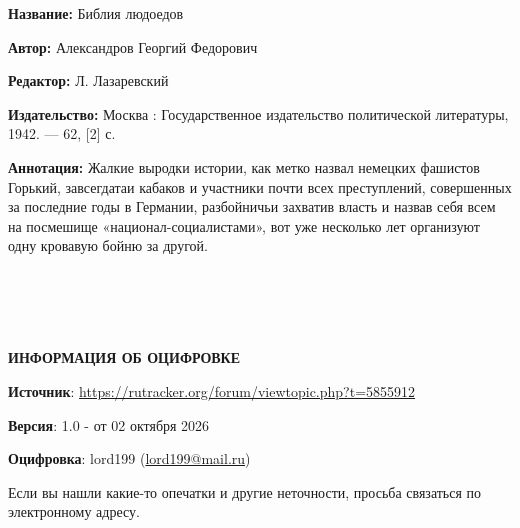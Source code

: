 \documentclass[12pt, a4paper, openany]{book}
\begin{document}
	{\bf Название:} Библия людоедов
	
{\bf Автор:} Александров Георгий Федорович

{\bf Редактор:} Л. Лазаревский
	
{\bf Издательство:} Москва : Государственное издательство политической литературы, 1942. — 62, [2] с.
	
		{\bf Аннотация:} Жалкие выродки истории, как метко назвал немецких фашистов Горький, завсегдатаи кабаков и участники почти всех преступлений, совершенных за последние годы в Германии, разбойничьи захватив власть и назвав себя всем на посмешище «национал-социалистами», вот уже несколько лет организуют одну кровавую бойню за другой.
		


		\thispagestyle{empty} %


\newpage

\setcounter{secnumdepth}{0}  


\ \\
\ \\
\ \\
\ \\

\hangindent=2cm   	\textbf{ИНФОРМАЦИЯ ОБ ОЦИФРОВКЕ}

\hangindent=2cm   	\textbf{Источник}:  \href{https://rutracker.org/forum/viewtopic.php?t=5855912}{https://rutracker.org/forum/viewtopic.php?t=5855912} 

\hangindent=2cm   	\textbf{Версия}: 1.0 - от 02 октября 2026

\hangindent=2cm   	\textbf{Оцифровка}: lord199 (\href{mailto:lord199@mail.ru}{lord199@mail.ru})



\hangindent=2cm   Если вы нашли какие-то опечатки и другие неточности, просьба связаться по электронному адресу.




\thispagestyle{empty} %
	
\end{document}

